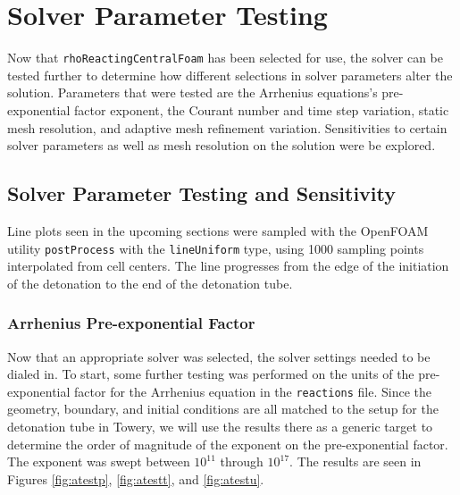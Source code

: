 \chapter{Solver Parameter Testing}
\label{solvtestchap}







Now that \verb|rhoReactingCentralFoam| has been selected for use, the solver can be tested further to determine how different selections in solver parameters alter the solution. Parameters that were tested are the Arrhenius equations's pre-exponential factor exponent, the Courant number and time step variation, static mesh resolution, and adaptive mesh refinement variation. Sensitivities to certain solver parameters as well as mesh resolution on the solution were be explored. 


\section{Solver Parameter Testing and Sensitivity}
Line plots seen in the upcoming sections were sampled with the OpenFOAM utility \verb|postProcess| with the \verb|lineUniform| type, using 1000 sampling points interpolated from cell centers. The line progresses from the edge of the initiation of the detonation to the end of the detonation tube. 


\subsection{Arrhenius Pre-exponential Factor}
Now that an appropriate solver was selected, the solver settings needed to be dialed in. To start, some further testing was performed on the units of the pre-exponential factor for the Arrhenius equation in the \verb|reactions| file. Since the geometry, boundary, and initial conditions are all matched to the setup for the detonation tube in Towery\cite{towery1}, we will use the results there as a generic target to determine the order of magnitude of the exponent on the pre-exponential factor. The exponent was swept between \(10^{11}\) through \(10^{17}\). The results are seen in Figures \ref{fig:atestp}, \ref{fig:atestt}, and \ref{fig:atestu}. 

